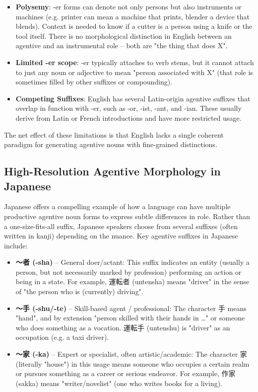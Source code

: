 \documentclass[11pt]{article}
\begin{document}
\begin{itemize}
\item \textbf{Polysemy}: -er forms can denote not only persons but also instruments or machines (e.g. printer can mean a machine that prints, blender a device that blends). Context is needed to know if a cutter is a person using a knife or the tool itself. There is no morphological distinction in English between an agentive and an instrumental role – both are "the thing that does X".

\item \textbf{Limited -er scope}: -er typically attaches to verb stems, but it cannot attach to just any noun or adjective to mean "person associated with X" (that role is sometimes filled by other suffixes or compounding).

\item \textbf{Competing Suffixes}: English has several Latin-origin agentive suffixes that overlap in function with -er, such as -or, -ist, -ant, and -ian. These usually derive from Latin or French introductions and have more restricted usage.
\end{itemize}

The net effect of these limitations is that English lacks a single coherent paradigm for generating agentive nouns with fine-grained distinctions.

\subsection{High-Resolution Agentive Morphology in Japanese}

Japanese offers a compelling example of how a language can have multiple productive agentive noun forms to express subtle differences in role. Rather than a one-size-fits-all suffix, Japanese speakers choose from several suffixes (often written in kanji) depending on the nuance. Key agentive suffixes in Japanese include:

\begin{itemize}
\item \textbf{〜者 (-sha)} – General doer/actant: This suffix indicates an entity (usually a person, but not necessarily marked by profession) performing an action or being in a state. For example, 運転者 (untensha) means "driver" in the sense of "the person who is (currently) driving".

\item \textbf{〜手 (-shu/-te)} – Skill-based agent / professional: The character 手 means "hand", and by extension "person skilled with their hands in …" or someone who does something as a vocation. 運転手 (untenshu) is "driver" as an occupation (e.g. a taxi driver).

\item \textbf{〜家 (-ka)} – Expert or specialist, often artistic/academic: The character 家 (literally "house") in this usage means someone who occupies a certain realm or pursues something as a career or serious endeavor. For example, 作家 (sakka) means "writer/novelist" (one who writes books for a living).
\end{itemize}
\end{document}
